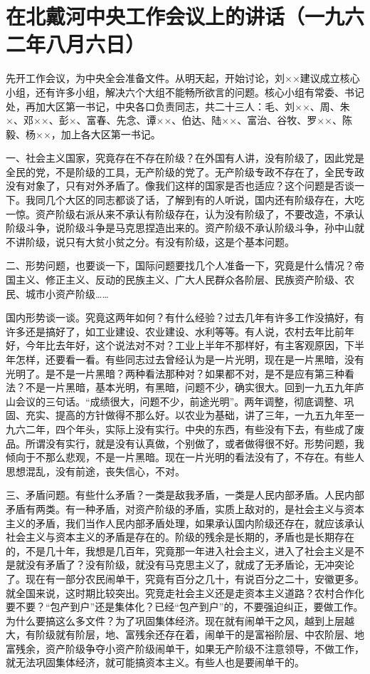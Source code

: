 \section{在北戴河中央工作会议上的讲话（一九六二年八月六日）}


先开工作会议，为中央全会准备文件。从明天起，开始讨论，刘××建议成立核心小组，还有许多小组，解决六个大组不能畅所欲言的问题。核心小组有常委、书记处，再加大区第一书记，中央各口负责同志，共二十三人：毛、刘××、周、朱×、邓××、彭×、富春、先念、谭××、伯达、陆××、富治、谷牧、罗××、陈毅、杨××，加上各大区第一书记。

一、社会主义国家，究竟存在不存在阶级？在外国有人讲，没有阶级了，因此党是全民的党，不是阶级的工具，无产阶级的党了。无产阶级专政不存在了，全民专政没有对象了，只有对外矛盾了。像我们这样的国家是否也适应？这个问题是否谈一下。我同几个大区的同志都谈了话，了解到有的人听说，国内还有阶级存在，大吃一惊。资产阶级右派从来不承认有阶级存在，认为没有阶级了，不要改造，不承认阶级斗争，说阶级斗争是马克思捏造出来的。资产阶级不承认阶级斗争，孙中山就不讲阶级，说只有大贫小贫之分。有没有阶级，这是个基本问题。

二、形势问题，也要谈一下，国际问题要找几个人准备一下，究竟是什么情况？帝国主义、修正主义、反动的民族主义、广大人民群众各阶层、民族资产阶级、农民、城市小资产阶级……

国内形势谈一谈。究竟这两年如何？有什么经验？过去几年有许多工作没搞好，有许多还是搞好了，如工业建设、农业建设、水利等等。有人说，农村去年比前年好，今年比去年好，这个说法对不对？工业上半年不那样好，有主客观原因，下半年怎样，还要看一看。有些同志过去曾经认为是一片光明，现在是一片黑暗，没有光明了。是不是一片黑暗？两种看法那种对？如果都不对，是不是应有第三种看法？不是一片黑暗，基本光明，有黑暗，问题不少，确实很大。回到一九五九年庐山会议的三句话。“成绩很大，问题不少，前途光明”。两年调整，彻底调整、巩固、充实、提高的方针做得不那么好。以农业为基础，讲了三年，一九五九年至一九六二年，四个年头，实际上没有实行。中央的东西，有些没有下去，有些成了废品。所谓没有实行，就是没有认真做，个别做了，或者做得很不好。形势问题，我倾向于不那么悲观，不是一片黑暗。现在一片光明的看法没有了，不存在。有些人思想混乱，没有前途，丧失信心，不对。

三、矛盾问题。有些什么矛盾？一类是敌我矛盾，一类是人民内部矛盾。人民内部矛盾有两类。有一种矛盾，对资产阶级的矛盾，实质上敌对的，是社会主义与资本主义的矛盾，我们当作人民内部矛盾处理，如果承认国内阶级还存在，就应该承认社会主义与资本主义的矛盾是存在的。阶级的残余是长期的，矛盾也是长期存在的，不是几十年，我想是几百年，究竟那一年进入社会主义，进入了社会主义是不是就没有矛盾了？没有阶级，就没有马克思主义了，就成了无矛盾论，无冲突论了。现在有一部分农民闹单干，究竟有百分之几十，有说百分之二十，安徽更多。就全国来说，这时期比较突出。究竞走社会主义还是走资本主义道路？农村合作化要不要？“包产到户”还是集体化？已经“包产到户”的，不要强迫纠正，要做工作。为什么要搞这么多文件？为了巩固集体经济。现在就有闹单干之风，越到上层越大，有阶级就有阶层，地、富残余还存在着，闹单干的是富裕阶层、中农阶层、地富残余，资产阶级争夺小资产阶级闹单干，如果无产阶级不注意领导，不做工作，就无法巩固集体经济，就可能搞资本主义。有些人也是要闹单干的。

